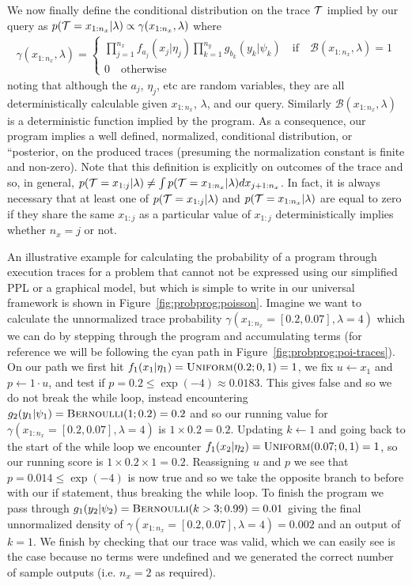 We now finally define the conditional distribution on the trace $\mathcal{T}$
implied by our query as $p(\mathcal{T} = x_{1:n_x} | \lambda)
\propto \gamma(x_{1:n_x}, \lambda)$ where
\begin{align}
\label{eq:probprog:universal-cond}
\gamma(x_{1:n_x}, \lambda) = \begin{cases}
\prod_{j=1}^{n_x} 
f_{a_j}(x_j | \eta_j)
\prod_{k=1}^{n_y}
g_{b_k}(y_k | \psi_k) \quad \text{if} \quad \mathcal{B}(x_{1:n_x},\lambda)=1 \\
0 \quad \text{otherwise}
\end{cases}
\end{align}
noting that although the $a_j$, $\eta_j$, etc are random variables, they are all deterministically
calculable given $x_{1:n_x}$, $\lambda$, and our query.  Similarly $\mathcal{B}(x_{1:n_x},\lambda)$
is a deterministic function implied by the program. As a consequence, our program implies a well
defined, normalized, conditional distribution, or ``posterior, on the produced traces
(presuming the normalization constant is finite and non-zero). 
Note that this definition is
explicitly on outcomes of the trace and so, in general, $p(\mathcal{T} = x_{1:j} | \lambda) \neq
\int p(\mathcal{T} = x_{1:n_x} | \lambda) dx_{j+1:n_x}$.  In fact, it is always necessary that at least one of
$p(\mathcal{T} = x_{1:j} | \lambda)$ and $p(\mathcal{T} = x_{1:n_x} | \lambda)$ are equal to zero if they share the
same $x_{1:j}$ as a particular value
of $x_{1:j}$ deterministically implies whether $n_x=j$ or not.

An illustrative example for calculating the probability of a program through execution traces
for a problem that cannot not be expressed using our simplified PPL or a graphical model, but
which is simple to write in our universal framework is shown in Figure~\ref{fig:probprog:poisson}.
Imagine we want to calculate the unnormalized trace probability
$\gamma(x_{1:n_x}=[0.2,0.07],\lambda=4)$ which we can do by stepping through the program and accumulating
terms (for reference we will be following the cyan path
in Figure~\ref{fig:probprog:poi-traces}).  
On our path we first hit $f_1(x_1 | \eta_1) = \textsc{Uniform}(0.2;0,1) = 1$, we fix $u\leftarrow x_1$
and $p\leftarrow 1\cdot u$, and test if $p=0.2\le \exp(-4) \approx 0.0183$.  This gives false
and so we do not break the while loop, instead encountering
$g_2(y_1 | \psi_1) = \textsc{Bernoulli}(1;0.2) = 0.2$ and so our running value for
$\gamma(x_{1:n_x}=[0.2,0.07],\lambda=4)$ is $1\times0.2 = 0.2$.  Updating $k\leftarrow1$ and
going back to the
start of the while loop we encounter $f_1(x_2 | \eta_2) = \textsc{Uniform}(0.07;0,1) = 1$,
so our running score is $1\times0.2\times1=0.2$.
Reassigning $u$ and $p$ we see that  $p=0.014\le \exp(-4)$ is now true and so we take
the opposite branch to before with our if statement, thus breaking the while loop.  To
finish the program we pass through $g_1(y_2 | \psi_2) = \textsc{Bernoulli}(k>3;0.99) = 0.01$
giving the final unnormalized density of $\gamma(x_{1:n_x}=[0.2,0.07],\lambda=4)=0.002$ and an output of $k=1$.
We finish by checking that our trace was valid, which we can easily see is the case because
no terms were undefined and we generated the correct number of sample outputs (i.e. $n_x=2$ as
required).

